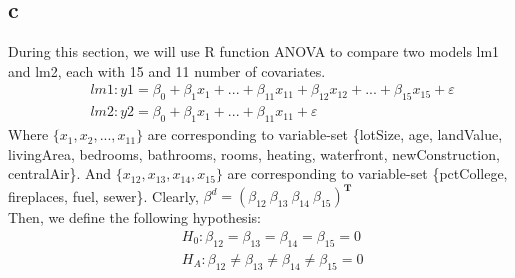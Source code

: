 \documentclass[12pt]{article}
\begin{document}
\subsection{c}
During this section, we will use R function ANOVA to compare two models lm1 and lm2, each with 15 and 11 number of covariates.
\begin{equation}
\begin{split}
&\quad lm1 : y1 = \beta_0+\beta_1x_1+...+\beta_{11}x_{11}+\beta_{12}x_{12}+...+\beta_{15}x_{15}+\varepsilon\\
&\quad lm2 : y2 = \beta_0+\beta_1x_1+...+\beta_{11}x_{11}+\varepsilon
\end{split}
\end{equation}
Where $\{x_1, x_2, ... , x_{11}\}$ are corresponding to variable-set \{lotSize, age, landValue, livingArea, bedrooms, bathrooms, rooms, heating, waterfront, newConstruction, centralAir\}. And $\{x_{12}, x_{13}, x_{14}, x_{15}\}$ are corresponding to variable-set \{pctCollege, fireplaces, fuel, sewer\}. Clearly, $\beta^d = (\beta_{12} \ \beta_{13} \ \beta_{14} \ \beta_{15})^\textbf{T}$\\
Then, we define the following hypothesis:
\begin{equation}
\begin{split}
&\quad H_0: \beta_{12} = \beta_{13} = \beta_{14} = \beta_{15} = 0\\
&\quad H_A: \beta_{12} \neq \beta_{13} \neq \beta_{14} \neq \beta_{15} = 0
\end{split}
\end{equation}
\end{document}
